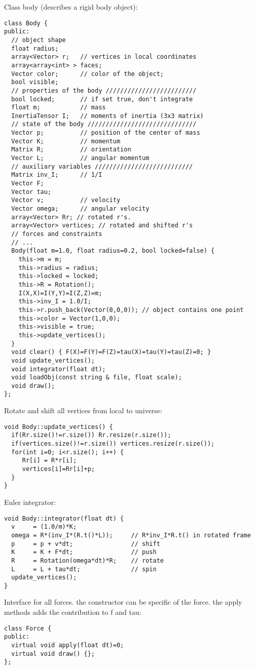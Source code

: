 \noindent
Class body (describes a rigid body object): \begin{lstlisting}
class Body {
public:
  // object shape
  float radius;
  array<Vector> r;   // vertices in local coordinates
  array<array<int> > faces;
  Vector color;      // color of the object;
  bool visible;
  // properties of the body /////////////////////////
  bool locked;       // if set true, don't integrate
  float m;           // mass
  InertiaTensor I;   // moments of inertia (3x3 matrix)
  // state of the body //////////////////////////////
  Vector p;          // position of the center of mass
  Vector K;          // momentum
  Matrix R;          // orientation
  Vector L;          // angular momentum
  // auxiliary variables ///////////////////////////
  Matrix inv_I;      // 1/I
  Vector F;
  Vector tau;
  Vector v;          // velocity
  Vector omega;      // angular velocity
  array<Vector> Rr; // rotated r's.
  array<Vector> vertices; // rotated and shifted r's
  // forces and constraints
  // ...
  Body(float m=1.0, float radius=0.2, bool locked=false) {
    this->m = m;
    this->radius = radius;
    this->locked = locked;
    this->R = Rotation();
    I(X,X)=I(Y,Y)=I(Z,Z)=m;
    this->inv_I = 1.0/I;
    this->r.push_back(Vector(0,0,0)); // object contains one point
    this->color = Vector(1,0,0);
    this->visible = true;
    this->update_vertices();
  }
  void clear() { F(X)=F(Y)=F(Z)=tau(X)=tau(Y)=tau(Z)=0; }
  void update_vertices();
  void integrator(float dt);
  void loadObj(const string & file, float scale);
  void draw();
};
\end{lstlisting}
\noindent
Rotate and shift all vertices from local to universe: \begin{lstlisting}
void Body::update_vertices() {
  if(Rr.size()!=r.size()) Rr.resize(r.size());
  if(vertices.size()!=r.size()) vertices.resize(r.size());
  for(int i=0; i<r.size(); i++) {
     Rr[i] = R*r[i];
     vertices[i]=Rr[i]+p;
  }
}
\end{lstlisting}
\noindent
Euler integrator: \begin{lstlisting}
void Body::integrator(float dt) {
  v     = (1.0/m)*K;
  omega = R*(inv_I*(R.t()*L));     // R*inv_I*R.t() in rotated frame
  p     = p + v*dt;                // shift
  K     = K + F*dt;                // push
  R     = Rotation(omega*dt)*R;    // rotate
  L     = L + tau*dt;              // spin
  update_vertices();
}
\end{lstlisting}
\noindent
Interface for all forces.
the constructor can be specific of the force.
the apply methods adds the contribution to f and tau: \begin{lstlisting}
class Force {
public:
  virtual void apply(float dt)=0;
  virtual void draw() {};
};
\end{lstlisting}
